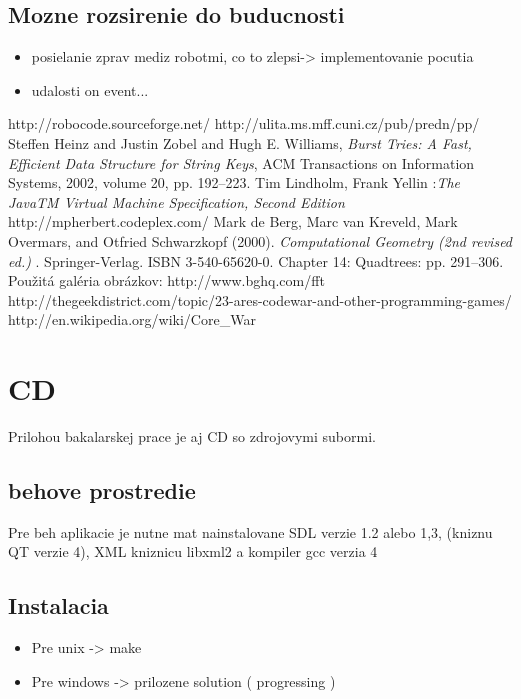 \documentclass[a4paper,11pt,final]{report}
\begin{document}
\section{Mozne rozsirenie do buducnosti}
\begin{itemize}
\item posielanie zprav mediz robotmi, co to zlepsi-> implementovanie pocutia
\item udalosti on event...
\end{itemize}
\tableofcontents
{}
\begin{thebibliography}{99}
 http://robocode.sourceforge.net/
 http://ulita.ms.mff.cuni.cz/pub/predn/pp/
Steffen Heinz and Justin Zobel and Hugh E. Williams,
    \emph{Burst Tries: A Fast, Efficient Data Structure for String Keys},
    ACM Transactions on Information Systems, 2002,
    volume 20, pp. 192--223.
 Tim Lindholm, Frank Yellin :\emph{The JavaTM Virtual Machine Specification, Second Edition}
http://mpherbert.codeplex.com/
   Mark de Berg, Marc van Kreveld, Mark Overmars, and Otfried Schwarzkopf (2000). \emph{ Computational Geometry (2nd revised ed.) }. Springer-Verlag. ISBN 3-540-65620-0.  Chapter 14: Quadtrees: pp. 291–306.
 Použitá galéria obrázkov: http://www.bghq.com/fft 
 http://thegeekdistrict.com/topic/23-ares-codewar-and-other-programming-games/
 http://en.wikipedia.org/wiki/Core\_War
\end{thebibliography}
\appendix
\chapter{CD}
Prilohou bakalarskej prace je aj CD so zdrojovymi subormi.
\section{behove prostredie}
Pre beh aplikacie je nutne mat nainstalovane SDL verzie 1.2 alebo 1,3, (kniznu QT verzie 4), XML kniznicu libxml2 a kompiler gcc verzia 4
\section{Instalacia}
\begin{itemize}
\item Pre unix -> make
\item Pre windows -> prilozene solution ( progressing )
\end{itemize}
\end{document}

